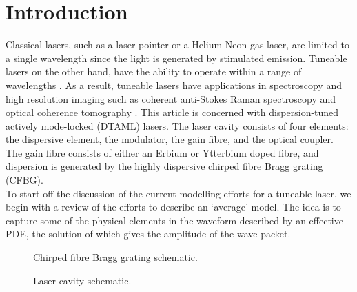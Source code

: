 
\chapter{Introduction}
Classical lasers, such as a laser pointer or a Helium-Neon gas laser, are limited to a single wavelength since the light is generated by stimulated emission. Tuneable lasers on the other hand, have the ability to operate within a range of wavelengths \cite{bohun, burgoyne2010, yamashita}. As a result, tuneable lasers have applications in spectroscopy and high resolution imaging such as coherent anti-Stokes Raman spectroscopy and optical coherence tomography \cite{bohun, burgoyne2014, yamashita}. This article is concerned with dispersion-tuned actively mode-locked (DTAML) lasers. The laser cavity consists of four elements: the dispersive element, the modulator, the gain fibre, and the optical coupler. The gain fibre consists of either an Erbium or Ytterbium doped fibre, and dispersion is generated by the highly dispersive chirped fibre Bragg grating (CFBG). \\

To start off the discussion of the current modelling efforts for a tuneable laser, we begin with a review of the efforts to describe an `average' model. The idea is to capture some of the physical elements in the waveform described by an effective PDE, the solution of which gives the amplitude of the wave packet.

\begin{figure}[htbp]
\centering

\label{fig:cfbg}
\caption[Chirped Fibre Bragg Grating]{Chirped fibre Bragg grating schematic.}
\end{figure}

\begin{figure}[htbp]
\centering

\label{fig:cavity}
\caption[Laser Cavity]{Laser cavity schematic.}
\end{figure}
